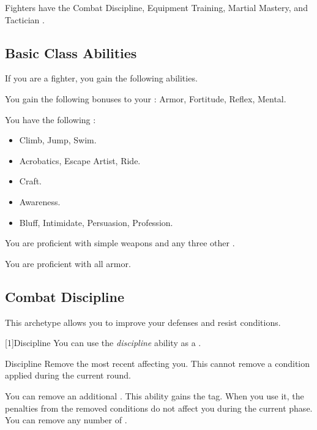      Fighters have the Combat Discipline, Equipment Training, Martial Mastery, and Tactician .

    \subsection{Basic Class Abilities}
        If you are a fighter, you gain the following abilities.

        You gain the following bonuses to your :  Armor,  Fortitude,  Reflex,  Mental.

        You have the following :
        \begin{itemize}
            \item {} Climb, Jump, Swim.
            \item {} Acrobatics, Escape Artist, Ride.
            \item {} Craft.
            \item {} Awareness.
            \item {} Bluff, Intimidate, Persuasion, Profession.
        \end{itemize}

        You are proficient with simple weapons and any three other .

        You are proficient with all armor.

    \subsection{Combat Discipline}
        This archetype allows you to improve your defenses and resist conditions.

        [1]{Discipline} You can use the \textit{discipline} ability as a .
        \begin{freeability}{Discipline}
            Remove the most recent  affecting you.
            This cannot remove a condition applied during the current round.

            \rankline
             You can remove an additional .
             This ability gains the  tag.
            When you use it, the penalties from the removed conditions do not affect you during the current phase.
             You can remove any number of .
        \end{freeability}

